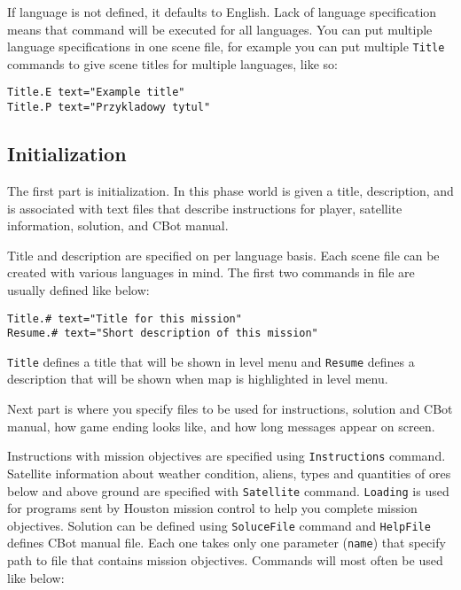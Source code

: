 If language is not defined, it defaults to English. Lack of language specification means that command will be executed for all languages. You can put multiple language specifications in one scene file, for example you can put multiple \texttt{Title} commands to give scene titles for multiple languages, like so:

\begin{lstlisting}[style=scene]
Title.E text="Example title"
Title.P text="Przykladowy tytul"
\end{lstlisting}



\subsection{Initialization}

The first part is initialization. In this phase world is given a title, description, and is associated with text files that describe instructions for player, satellite information, solution, and CBot manual.

Title and description are specified on per language basis. Each scene file can be created with various languages in mind. The first two commands in file are usually defined like below:

\begin{lstlisting}[style=scene]
Title.# text="Title for this mission"
Resume.# text="Short description of this mission"
\end{lstlisting}

\texttt{Title} defines a title that will be shown in level menu and \texttt{Resume} defines a description that will be shown when map is highlighted in level menu.

Next part is where you specify files to be used for instructions, solution and CBot manual, how game ending looks like, and how long messages appear on screen.

Instructions with mission objectives are specified using \texttt{Instructions} command. Satellite information about weather condition, aliens, types and quantities of ores below and above ground are specified with \texttt{Satellite} command. \texttt{Loading} is used for programs sent by Houston mission control to help you complete mission objectives. Solution can be defined using \texttt{SoluceFile} command and \texttt{HelpFile} defines CBot manual file. Each one takes only one parameter (\texttt{name}) that specify path to file that contains mission objectives. Commands will most often be used like below:


